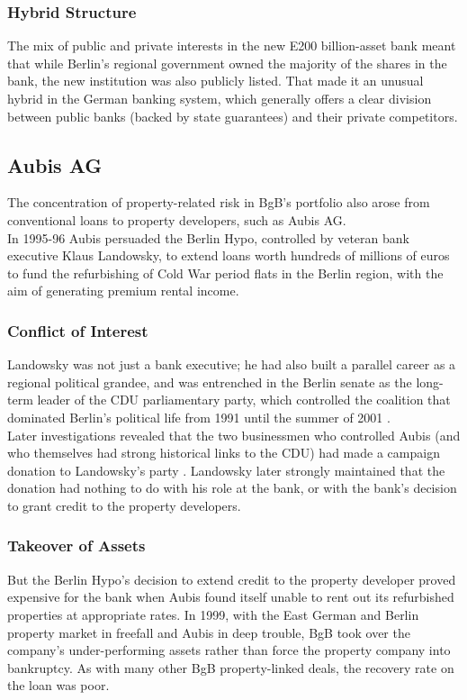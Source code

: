 \documentclass[12pt, a4paper]{report}
\begin{document}
\subsubsection{Hybrid Structure} The mix of
public and private interests in the new E200 billion-asset bank
meant that while Berlin's regional government owned the majority
of the shares in the bank, the new institution was also publicly
listed. That made it an unusual hybrid in the German banking
system, which generally offers a clear division between public
banks (backed by state guarantees) and their private competitors.

\subsection{Aubis AG}
The concentration of property-related risk in BgB's portfolio also
arose from conventional loans to property developers, such as
Aubis AG.
\\
In 1995-96 Aubis persuaded the Berlin Hypo, controlled by veteran
bank executive Klaus Landowsky, to extend loans worth hundreds of
millions of euros to fund the refurbishing of Cold War period
flats in the Berlin region, with the aim of generating premium
rental income.
\subsubsection{Conflict of Interest} Landowsky
was not just a bank executive; he had also built a parallel career
as a regional political grandee, and was entrenched in the Berlin
senate as the long-term leader of the CDU parliamentary party,
which controlled the coalition that dominated Berlin's political
life from 1991 until the summer of 2001 .
\\
Later investigations revealed that the two businessmen who
controlled Aubis (and who themselves had strong historical links
to the CDU) had made a campaign donation to Landowsky's party .
Landowsky later strongly maintained that the donation had nothing
to do with his role at the bank, or with the bank's decision to
grant credit to the property developers.
\subsubsection{Takeover of Assets}
But the Berlin Hypo's decision to extend credit to the property
developer proved expensive for the bank when Aubis found itself
unable to rent out its refurbished properties at appropriate
rates. In 1999, with the East German and Berlin property market in
freefall and Aubis in deep trouble, BgB took over the company's
under-performing assets rather than force the property company
into bankruptcy. As with many other BgB property-linked deals, the
recovery rate on the loan was poor.
\end{document}
